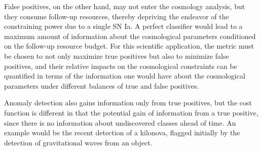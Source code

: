False positives, on the other hand, may not enter the cosmology analysis, but they consume follow-up resources, thereby depriving the endeavor of the constraining power due to a single SN Ia.
A perfect classifier would lead to a maximum amount of information about the cosmological parameters conditioned on the follow-up resource budget.
For this scientific application, the metric must be chosen to not only maximize true positives but also to minimize false positives, and their relative impacts on the cosmological constraints can be quantified in terms of the information one would have about the cosmological parameters under different balances of true and false positives.

Anomaly detection also gains information only from true positives, but the cost function is different in that the potential gain of information from a true positive, since there is no information about undiscovered classes ahead of time. An example would be the recent detection of a kilonova, flagged initially by the detection of gravitational waves from an object.

